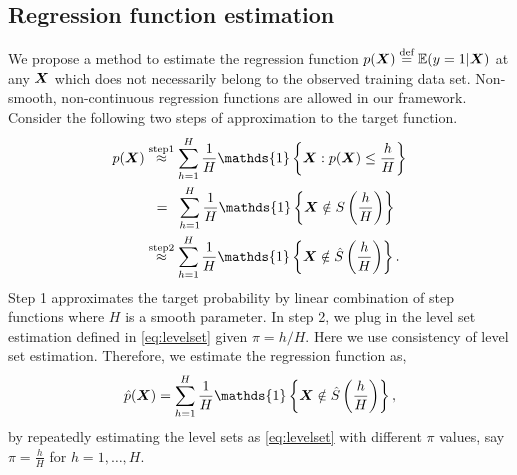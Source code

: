 \documentclass[12pt]{article}
\begin{document}
\subsection{Regression function estimation}
\label{subsec:pb3}
We propose a method to estimate  the regression function $p(\bm X)\stackrel{\text{def}}{=}\mathbb{E}(y = 1|\bm X)$ at any $\bm X$ which does not necessarily belong to the observed training data set. Non-smooth, non-continuous regression functions are allowed in our framework. Consider the following two steps of approximation to the target function.
\begin{align}
\label{eq:approx}
p(\mX) &\stackrel{\text{step1}}{\approx} \sum_{h=1}^H\frac{1}{H}\mathds{1}\left\{\mX: p(\mX)\leq\frac{h}{H}\right\}\\&\hspace{.2cm}=\hspace{.2cm} \sum_{h=1}^H\frac{1}{H}\mathds{1}\left\{\mX\notin S\left(\frac{h}{H}\right)\right\}
\\&\stackrel{\text{step2}}{\approx} \sum_{h=1}^H\frac{1}{H}\mathds{1}\left\{\mX\notin\hat S\left(\frac{h}{H}\right)\right\}.
\end{align}
Step 1 approximates the target probability by linear combination of step functions where $H$ is a smooth parameter. In step 2, we plug in the level set estimation defined in \eqref{eq:levelset} given $\pi = h/H$. Here we use consistency of level set estimation.
Therefore, we estimate the regression function as,\begin{align}
\hat p(\mX) = \sum_{h=1}^H\frac{1}{H}\mathds{1}\left\{\mX\notin\hat S\left(\frac{h}{H}\right)\right\},
\end{align}
by repeatedly estimating the level sets as \eqref{eq:levelset} with different $\pi$ values, say  $\pi = \frac{h}{H}$ for $h = 1,\ldots, H$. 
\end{document}
